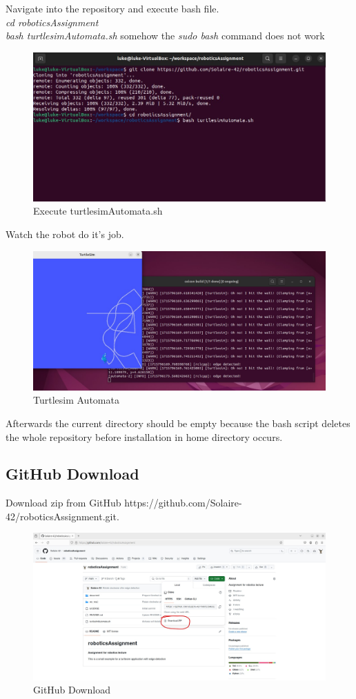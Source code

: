 Navigate into the repository and execute bash file. \\
\textit{cd roboticsAssignment} \\
\textit{bash turtlesimAutomata.sh} \hfill somehow the \textit{sudo bash} command does not work \\
\begin{figure}[H]
    \centering
    \includegraphics[width=0.8\linewidth]{document//Figure/03execute.jpg}
    \caption{Execute turtlesimAutomata.sh}
\end{figure}

Watch the robot do it's job.
\begin{figure}[H]
    \centering
    \includegraphics[width=0.8\linewidth]{document//Figure/04turtlesim.jpg}
    \caption{Turtlesim Automata}
\end{figure}

Afterwards the current directory should be empty because the bash script deletes the whole repository before installation in home directory occurs. 

\newpage

\subsection{GitHub Download}
Download zip from GitHub https://github.com/Solaire-42/roboticsAssignment.git.
\begin{figure}[H]
    \centering
    \includegraphics[width=0.8\linewidth]{document//Figure/05download.jpg}
    \caption{GitHub Download}
\end{figure}

